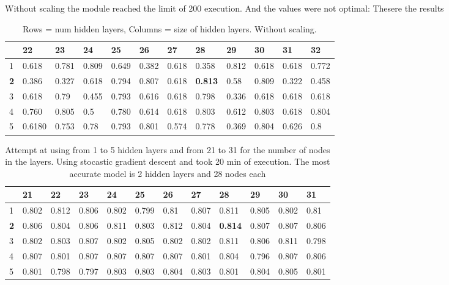 \documentclass{article}
\begin{document}
Without scaling the module reached the limit of 200 execution. And the values
were not optimal: 
Thesere the results 

\begin{table}[]
\caption{Rows = num hidden layers, Columns = size of hidden layers. Without scaling.}
\label{tab:sklearn-NoScaling}
\begin{tabular}{|l|l|l|l|l|l|l|l|l|l|l|l|}
\hline
           & 22       & 23       & 24       & 25       & 26       & 27       & \textbf{28}       & 29       & 30       & 31       & 32       \\ \hline
1          & 0.618 & 0.781 & 0.809 & 0.649 & 0.382 & 0.618 & 0.358          & 0.812 & 0.618 & 0.618 & 0.772 \\ \hline
\textbf{2} & 0.386 & 0.327 & 0.618 & 0.794 & 0.807 & 0.618 & \textbf{0.813} & 0.58 & 0.809 & 0.322 & 0.458 \\ \hline
3          & 0.618 & 0.79 & 0.455 & 0.793 & 0.616 & 0.618 & 0.798          & 0.336 & 0.618 & 0.618 & 0.618 \\ \hline
4          & 0.760 & 0.805 & 0.5 & 0.780 & 0.614 & 0.618 & 0.803          & 0.612 & 0.803 & 0.618 & 0.804 \\ \hline
5          & 0.6180 & 0.753 & 0.78 & 0.793 & 0.801 & 0.574 & 0.778          & 0.369 & 0.804 & 0.626 & 0.8 \\ \hline
\end{tabular}
\end{table}


\begin{table}[]
\caption{Attempt at using from 1 to 5 hidden layers and from 21 to 31 for the number of nodes in the layers. Using stocastic gradient descent and took 20 min of execution.
The most  accurate model is 2 hidden layers and 28 nodes each}
\label{tab:Scaled_gradient}
\begin{tabular}{|l|l|l|l|l|l|l|l|l|l|l|l|}
\hline
           & 21    & 22    & 23    & 24    & 25    & 26    & 27    & \textbf{28}    & 29    & 30    & 31    \\ \hline
1          & 0.802 & 0.812 & 0.806 & 0.802 & 0.799 & 0.81  & 0.807 & 0.811          & 0.805 & 0.802 & 0.81  \\ \hline
\textbf{2} & 0.806 & 0.804 & 0.806 & 0.811 & 0.803 & 0.812 & 0.804 & \textbf{0.814} & 0.807 & 0.807 & 0.806 \\ \hline
3          & 0.802 & 0.803 & 0.807 & 0.802 & 0.805 & 0.802 & 0.802 & 0.811          & 0.806 & 0.811 & 0.798 \\ \hline
4          & 0.807 & 0.801 & 0.807 & 0.807 & 0.807 & 0.807 & 0.801 & 0.804          & 0.796 & 0.807 & 0.806 \\ \hline
5          & 0.801 & 0.798 & 0.797 & 0.803 & 0.803 & 0.804 & 0.803 & 0.801          & 0.804 & 0.805 & 0.801 \\ \hline
\end{tabular}
\end{table}
\end{document}
